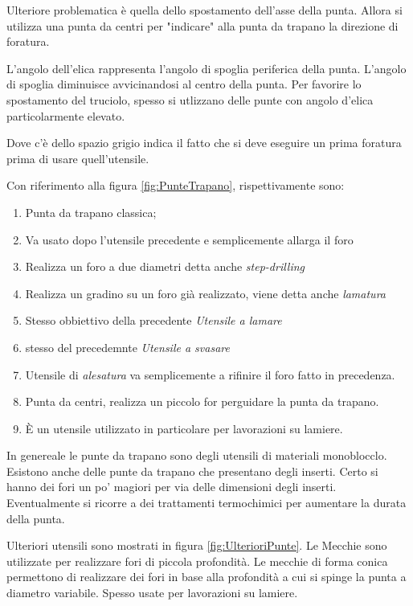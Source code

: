 Ulteriore problematica è quella dello spostamento dell'asse della punta. Allora si utilizza una punta
da centri per "indicare" alla punta da trapano la direzione di foratura.

L'angolo dell'elica rappresenta l'angolo di spoglia periferica della punta.
L'angolo di spoglia diminuisce avvicinandosi al centro della punta.
Per favorire lo spostamento del truciolo, spesso si utlizzano delle punte con angolo d'elica particolarmente 
elevato.

Dove c'è dello spazio grigio indica il fatto che si deve eseguire un prima foratura prima di usare 
quell'utensile.

Con riferimento alla figura \ref{fig:PunteTrapano}, rispettivamente sono:
\begin{enumerate}
\item Punta da trapano classica;
\item Va usato dopo l'utensile precedente e semplicemente allarga il foro
\item Realizza un foro a due diametri detta anche \emph{step-drilling}
\item Realizza un gradino su un foro già realizzato, viene detta anche \emph{lamatura}
\item Stesso obbiettivo della precedente \emph{Utensile a lamare}
\item stesso del precedemnte \emph{Utensile a svasare}
\item Utensile di \emph{alesatura} va semplicemente a rifinire il foro fatto in precedenza.
\item Punta da centri, realizza un piccolo for perguidare la punta da trapano.
\item È un utensile utilizzato in particolare per lavorazioni su lamiere.
\end{enumerate}

In genereale le punte da trapano sono degli utensili di materiali monoblocclo. Esistono anche delle punte
da trapano che presentano degli inserti. Certo si hanno dei fori un po' magiori per via delle dimensioni
degli inserti.
Eventualmente si ricorre a dei trattamenti termochimici per aumentare la durata della punta.

Ulteriori utensili sono mostrati in figura \ref{fig:UlterioriPunte}.
Le Mecchie sono utilizzate per realizzare fori di piccola profondità.
Le mecchie di forma conica permettono di realizzare dei fori in base alla profondità a cui si spinge la punta
a diametro variabile. Spesso usate per lavorazioni su lamiere.

